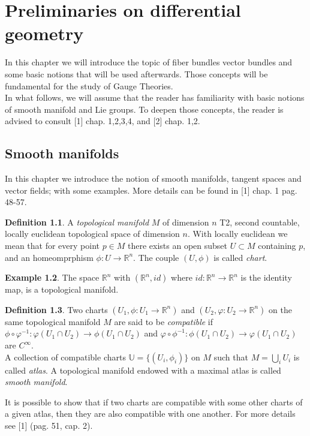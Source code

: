 \documentclass[12pt,a4paper]{report}
\theoremstyle{definition}
\newtheorem{Def}{Definition}[chapter]
\theoremstyle{Theorem}
\theoremstyle{definition}
\newtheorem{Ex}[Def]{Example}
\theoremstyle{definition}
\begin{document}
	\tableofcontents
	\chapter{Preliminaries on differential geometry}
	In this chapter we will introduce the topic of fiber bundles vector bundles and some basic notions that will be used afterwards. Those concepts will be fundamental for the study of Gauge Theories.\\
	In what follows, we will assume that the reader has familiarity with basic notions of smooth manifold and Lie groups. To deepen those concepts, the reader is advised to consult [1] chap. 1,2,3,4, and [2] chap. 1,2.
	\section{Smooth manifolds}
	In this chapter we introduce the notion of smooth manifolds, tangent spaces and vector fields; with some examples. More details can be found in [1] chap. 1 pag. 48-57.
	\begin{Def}
		A \textit{topological manifold} $M$ of dimension $n$ T2, second countable, locally euclidean topological space of dimension $n$. With locally euclidean we mean that for every point $p\in M$ there exists an open subset $U\subset M$ containing $p$, and an homeomprphism $\phi:U\rightarrow\mathbb{R}^n$. The couple $(U,\phi)$ is called \textit{chart}. 
	\end{Def}
	\begin{Ex}
		The space $\mathbb{R}^n$ with $(\mathbb{R}^n, id)$ where $id:\mathbb{R}^n\rightarrow \mathbb{R}^n$ is the identity map, is a topological manifold. 
	\end{Ex}
	\begin{Def}
		Two charts $(U_1,\phi:U_1\rightarrow\mathbb{R}^n)$ and $(U_2,\varphi:U_2\rightarrow\mathbb{R}^n)$ on the same topological manifold $M$ are said to be \textit{compatible} if
		$\phi\circ\varphi^{-1}:\varphi(U_1\cap U_2)\rightarrow \phi(U_1\cap U_2)$ and $\varphi\circ\phi^{-1}:\phi(U_1\cap U_2)\rightarrow \varphi(U_1\cap U_2)$ are $C^\infty$.\\
		A collection of compatible charts $\mathbb{U}=\{(U_i,\phi_{i})\}$ on $M$ such that $M=\bigcup_i U_i$ is called \textit{atlas}. A topological manifold endowed with a maximal atlas is called \textit{smooth manifold}.
	\end{Def}
	It is possible to show that if two charts are compatible with some other charts of a given atlas, then they are also compatible with one another. For more details see [1] (pag. 51, cap. 2).
\end{document}
